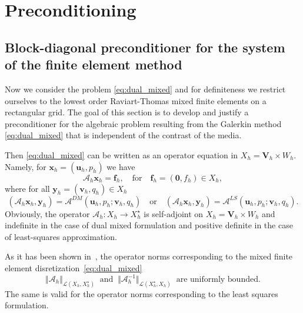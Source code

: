\documentclass[11pt]{amsart}
\numberwithin{equation}{section}
\theoremstyle{definition}\newtheorem{example}{Example}[section]
\begin{document}
\section{Preconditioning}\label{s:precon}

\subsection{Block-diagonal preconditioner for the system of the finite element method}\label{sec:b-diag-operator}
Now we consider the problem \eqref{eq:dual_mixed} and for definiteness
we restrict ourselves to the lowest order Raviart-Thomas mixed finite
elements on a rectangular grid. The goal of this section is to develop
and justify a preconditioner for the algebraic problem resulting from
the Galerkin method \eqref{eq:dual_mixed} that is independent of the
contrast of the media.

Then \eqref{eq:dual_mixed} can be written as an operator equation in $X_h={{\boldsymbol V}}_h\times W_h$.
Namely, for ${\bm x}_h =({{\mathbf u}}_h, p_h)$ we have 
\begin{equation}\label{mixed-operator}
 \mathcal{A}_h {\bm x}_h = {\bm f}_h, \quad \mbox{for} \quad
{\bm f}_h =({\bm 0}, f_h) \in X_h,
\end{equation}
where for all
$\bm{y}_h=({{\mathbf v}}_h,q_h)\in X_h$ 
$$
( \mathcal{A}_h {\bm x}_h, {\bm y}_h) = {{\mathcal A}}^{DM}({{\mathbf u}}_h,p_h; {{\mathbf v}}_h,q_h)
\quad
\mbox{or} \quad
 ( \mathcal{A}_h {\bm x}_h, {\bm y}_h) = {{\mathcal A}}^{LS}({{\mathbf u}}_h,p_h; {{\mathbf v}}_h,q_h).
$$
Obviously, the operator $\mathcal{A}_h:X_h\rightarrow X_h^{\star}$ is self-adjoint
on $X_h={{\boldsymbol V}}_h\times W_h$ and indefinite in the case of 
dual mixed formulation and positive definite  in the case of least-squares approximation.

As it has been shown in~\cite{1991BrezziF_FortinM-aa}, the operator norms 
corresponding to the mixed finite element disretization~\eqref{eq:dual_mixed}
\begin{equation}\label{eq:operator_norms}
 \Vert\mathcal{A}_h\Vert_{\mathcal{L}(X_h,X_h^{\star})}\;\; \mbox{and}\;\; 
\Vert\mathcal{A}_h^{-1}\Vert_{\mathcal{L}(X_h^{\star},X_h)} \;\; \mbox{are uniformly bounded}. 
\end{equation}
The same is valid for the operator norms corresponding to the least squares formulation.
\end{document}
